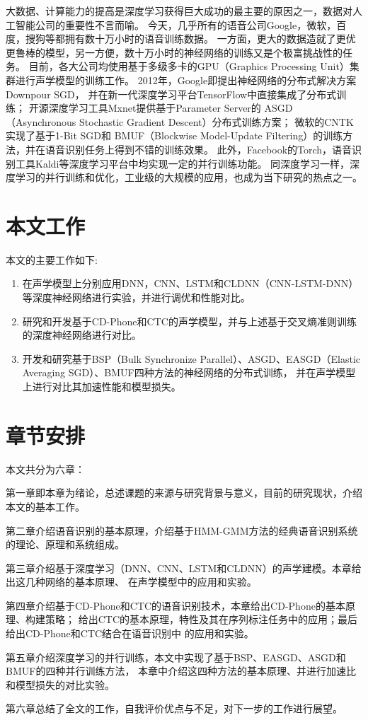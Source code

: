 大数据、计算能力的提高是深度学习获得巨大成功的最主要的原因之一，数据对人工智能公司的重要性不言而喻。
今天，几乎所有的语音公司Google，微软，百度，搜狗等都拥有数十万小时的语音训练数据。
一方面，更大的数据造就了更优更鲁棒的模型，另一方便，数十万小时的神经网络的训练又是个极富挑战性的任务。
目前，各大公司均使用基于多级多卡的GPU（Graphics Processing Unit）集群进行声学模型的训练工作。
2012年，Google即提出神经网络的分布式解决方案Downpour SGD，
并在新一代深度学习平台TensorFlow中直接集成了分布式训练；
开源深度学习工具Mxnet提供基于Parameter Server的
ASGD（Asynchronous Stochastic Gradient Descent）分布式训练方案；
微软的CNTK实现了基于1-Bit SGD和
BMUF（Blockwise Model-Update Filtering）的训练方法，并在语音识别任务上得到不错的训练效果。
此外，Facebook的Torch，语音识别工具Kaldi等深度学习平台中均实现一定的并行训练功能。
同深度学习一样，深度学习的并行训练和优化，工业级的大规模的应用，也成为当下研究的热点之一。


\section{本文工作}

本文的主要工作如下:
\begin{enumerate}
\item 在声学模型上分别应用DNN，CNN、LSTM和CLDNN（CNN-LSTM-DNN）等深度神经网络进行实验，并进行调优和性能对比。
\item 研究和开发基于CD-Phone和CTC的声学模型，并与上述基于交叉熵准则训练的深度神经网络进行对比。
\item 开发和研究基于BSP（Bulk Synchronize Parallel）、ASGD、EASGD（Elastic Averaging SGD）、BMUF四种方法的神经网络的分布式训练，
并在声学模型上进行对比其加速性能和模型损失。
\end{enumerate}

\section{章节安排}

本文共分为六章：

第一章即本章为绪论，总述课题的来源与研究背景与意义，目前的研究现状，介绍本文的基本工作。

第二章介绍语音识别的基本原理，介绍基于HMM-GMM方法的经典语音识别系统的理论、原理和系统组成。

第三章介绍基于深度学习（DNN、CNN、LSTM和CLDNN）的声学建模。本章给出这几种网络的基本原理、
在声学模型中的应用和实验。

第四章介绍基于CD-Phone和CTC的语音识别技术，本章给出CD-Phone的基本原理、构建策略；
给出CTC的基本原理，特性及其在序列标注任务中的应用；最后给出CD-Phone和CTC结合在语音识别中
的应用和实验。

第五章介绍深度学习的并行训练，本文中实现了基于BSP、EASGD、ASGD和BMUF的四种并行训练方法，
本章中介绍这四种方法的基本原理、并进行加速比和模型损失的对比实验。

第六章总结了全文的工作，自我评价优点与不足，对下一步的工作进行展望。
